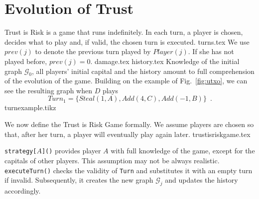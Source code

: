 \section{Evolution of Trust}
  Trust is Risk is a game that runs indefinitely. In each turn, a player is chosen, decides what to play and, if valid, the
  chosen turn is executed.
  {turns.tex}
  We use $prev\left(j\right)$ to denote the previous turn played by $Player(j)$. If she has not played before,
  $prev\left(j\right) = 0$.
  {damage.tex}
  {history.tex}
  \noindent Knowledge of the initial graph $\mathcal{G}_0$, all players' initial capital and the history amount to full
  comprehension of the evolution of the game. Building on the example of Fig.~\ref{fig:utxo}, we can see the resulting graph
  when $D$ plays
  \begin{equation}
  \label{turnexample}
     Turn_1 = \{Steal\left(1, A\right), Add\left(4, C\right), Add\left(-1, B\right)\} \enspace.
  \end{equation}
  {turnexample.tikz}

  \noindent We now define the Trust is Risk Game formally. We assume players are chosen so that, after her turn, a player will
  eventually play again later.
  {trustisriskgame.tex}

  \noindent \texttt{strategy[}$A$\texttt{]()} provides player $A$ with full knowledge of the game, except for the capitals of
  other players. This assumption may not be always realistic. \texttt{executeTurn()} checks the validity of \texttt{Turn} and
  substitutes it with an empty turn if invalid. Subsequently, it creates the new graph $\mathcal{G}_j$ and updates the
  history accordingly.
